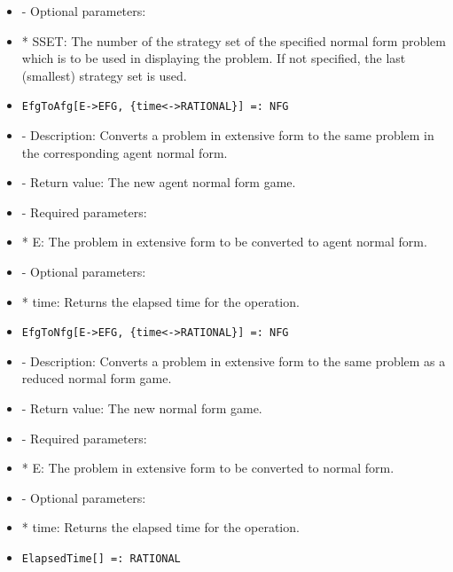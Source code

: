 \begin{itemize}
\item
- Optional parameters:	

\bd
\item
*  SSET:  The number of the strategy set of the specified normal form
problem which is to be used in displaying the problem.  If not
specified, the last (smallest) strategy set is used.
\ed
\ed

\item
\begin{verbatim}
EfgToAfg[E->EFG, {time<->RATIONAL}] =: NFG
\end{verbatim}

\bd
\item
- Description:  Converts a problem in extensive form to the same problem
in the corresponding agent normal form.
\item
- Return value:  The new agent normal form game.  
\item 
- Required parameters:

\bd
\item
*  E:  The problem in extensive form to be converted to agent normal form.
\ed

\item
- Optional parameters:
	
\bd
\item
*  time:  Returns the elapsed time for the operation.
\ed
\ed

\item
\begin{verbatim}
EfgToNfg[E->EFG, {time<->RATIONAL}] =: NFG
\end{verbatim}

\bd
\item
- Description:  Converts a problem in extensive form to the same problem
as a reduced normal form game.
\item
- Return value:  The new normal form game.  
\item
- Required parameters:
	
\bd
\item
*  E:  The problem in extensive form to be converted to normal form.
\ed

\item
- Optional parameters:
	
\bd
\item
*  time:  Returns the elapsed time for the operation.
\ed
\ed

\item

\begin{verbatim}
ElapsedTime[] =: RATIONAL
\end{verbatim}


\end{itemize}
